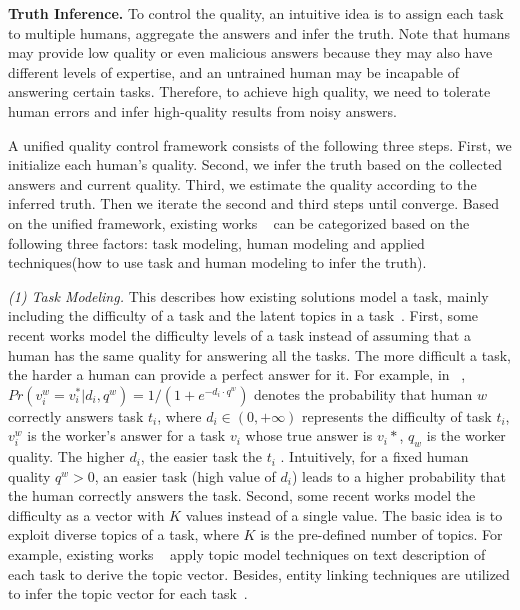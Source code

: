 \textbf{Truth Inference.}
To control the quality, an intuitive idea is to assign each task to multiple humans, aggregate the answers and infer the truth. 
Note that humans may provide low quality or even malicious answers because they  may also have different levels of expertise, and an untrained human may be incapable of answering certain tasks. Therefore, to achieve high quality, we need to tolerate human errors and infer high-quality results from noisy answers. 

A unified quality control framework consists of the following three steps. First, we initialize each human's quality. Second, we infer the truth based on the collected answers and current quality. Third,  we estimate the quality according to the inferred truth. Then we iterate the second and third steps until converge. Based on the unified framework, existing works ~\cite{DBLP:faitcrowd, DBLP:conf/nips/WhitehillRWBM09} can be categorized based on the following three factors: task modeling, human modeling and applied techniques(how to use task and human modeling to infer the truth).

\textit{(1) Task Modeling.} This describes how existing solutions model a task, mainly including the difficulty of a task and the latent topics in a task~\cite{DBLP:faitcrowd, DBLP:conf/nips/WhitehillRWBM09}. First, some recent works model the difficulty levels of a task instead of assuming that a human has the same quality for answering all the tasks. The more difficult a task, the harder a human can provide a perfect answer for it. 
For example, in ~\cite{DBLP:conf/nips/WhitehillRWBM09}, $Pr(v_i^w = v_i^* | d_i, q^w) = 1/(1+ e^ {-d_i \cdot q^w} )$ denotes the probability that human $w$ correctly answers task $t_i$, where $d_i \in (0, + \infty)$ represents the difficulty of task $t_i$, $v_i^w$ is the worker's answer for a task $v_i$ whose true answer is $v_i*$, $q_w$ is the worker quality. The higher $d_i$, the easier task the $t_i$ . Intuitively, for a fixed human quality $q^w > $0, an easier task (high value of $d_i$) leads to a higher probability that the human correctly answers the task.
Second, some recent works model the difficulty as a vector with $K$ values instead of a single value.  The basic idea is to exploit diverse topics of a task, where $K$ is the pre-defined number of topics. For example, existing works ~\cite{DBLP:icrowd,DBLP:faitcrowd} apply topic model techniques on text description of each task to derive the topic vector. Besides, entity linking techniques are utilized to infer the  topic vector for each task~\cite{DBLP:docs}.


